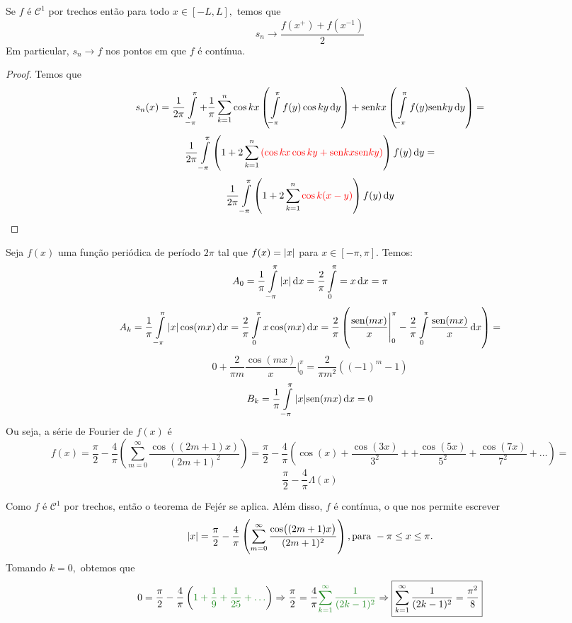 \documentclass[11pt,twoside,a4paper]{book}
\begin{document}
\begin{teorema}
Se $f$ é $\mathcal{C}^1$ por trechos então para todo $x \in [-L, L],$ temos que
\[
s_n \to \frac{f(x^{+}) + f(x^{-1})}{2}
\]
Em particular, $s_n \to f$ nos pontos em que $f$ é contínua.
\end{teorema}
\begin{proof}
Temos que
\[
s_n(x) = \frac{1}{2 \pi} \int\limits_{- \pi}^\pi + \frac{1}{\pi} \sum\limits_{k = 1}^n \cos k x \left(  \int\limits_{- \pi}^\pi f(y) \cos ky \dif y \right) + \sen k x \left(  \int\limits_{- \pi}^\pi f(y) \sen ky \dif y \right) =
\]
\[
\frac{1}{2 \pi} \int\limits_{- \pi}^{\pi} \left(  1 + 2 \sum\limits_{k = 1}^n \textcolor{red}{( \cos kx \cos ky + \sen kx \sen k y)} \right) f(y) \dif y =
\]
\[
\frac{1}{2 \pi} \int\limits_{- \pi}^{\pi} \left(  1 + 2 \sum\limits_{k = 1}^n \textcolor{red}{\cos k(x-y)}\right) f(y) \dif y
\]
\end{proof}


\begin{exemplo}
Seja $f(x)$ uma função periódica de período $2 \pi$ tal que $f(x) = \abs{x}$ para $x \in [-\pi, \pi].$ Temos:
\[
A_0 = \frac{1}{\pi} \int\limits_{- \pi}^\pi \abs{x} \dif x = \frac{2}{\pi} \int\limits_{0}^\pi = x \dif x = \pi
\]
\[
A_k = \frac{1}{\pi} \int\limits_{-\pi}^{\pi} \abs{x} \cos(mx) \dif x = \frac{2}{\pi} \int\limits_0^\pi x \cos (mx) \dif x = \frac{2}{\pi} \left( \frac{\sen(mx)}{x} \Bigg|_0^\pi - \frac{2}{\pi} \int\limits_0^\pi \frac{\sen(mx)}{x} \dif x \right) = \]\[0 + \frac{2}{\pi m} \frac{\cos(mx)}{x} \Bigg|_0^\pi = \frac{2}{\pi m^2} ((-1)^m  - 1)
\]
\[
B_k = \frac{1}{\pi} \int\limits_{-\pi}^{\pi} \abs{x} \sen(mx) \dif x = 0
\]
Ou seja, a série de Fourier de $f(x)$ é
\[
f(x) = \frac{\pi}{2} - \frac{4}{\pi} \left( \sum\limits_{m = 0}^\infty \frac{\cos((2m+1)x)}{(2m+1)^2}\right) = \frac{\pi}{2} - \frac{4}{\pi} \left(   \cos(x) + \frac{\cos(3x)}{3^2} + + \frac{\cos(5x)}{5^2} + \frac{\cos(7x)}{7^2} + \ldots  \right) = \]\[ \frac{\pi}{2} - \frac{4}{\pi}\Lambda (x)
\]

Como $f$ é $\mathcal{C}^1$ por trechos, então o teorema de Fejér se aplica. Além disso, $f$ é contínua, o que nos permite escrever
\[
\abs{x} = \frac{\pi}{2} - \frac{4}{\pi} \left( \sum\limits_{m = 0}^\infty \frac{\cos((2m+1)x)}{(2m+1)^2}\right), \mbox{para } -\pi \le x \le \pi.
\]
Tomando $k = 0,$ obtemos que
\[0 = \frac{\pi}{2} - \frac{4}{\pi} \left( \textcolor{Floresta}{1 + \frac{1}{9} + \frac{1}{25} + \ldots }\right) \Rightarrow \frac{\pi}{2} = \frac{4}{\pi} \textcolor{Floresta}{\sum\limits_{k = 1}^\infty \frac{1}{(2k-1)^2}} \Rightarrow \boxed{\sum\limits_{k = 1}^\infty \frac{1}{(2k-1)^2} = \frac{\pi^2}{8}}
\]
\end{exemplo}
\end{document}
